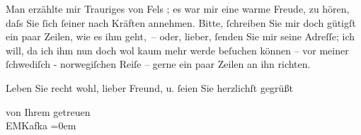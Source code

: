 \pstart
           
               Man erzählte mir Trauriges von 
               Fels
               ; es war mir
               eine warme Freude, zu hören, daſs Sie ſich ſeiner nach Kräften annehmen. Bitte,
               ſchreiben Sie mir doch gütigſt ein paar Zeilen, wie es ihm geht, – oder, lieber,
               ſenden Sie mir seine Adreſſe; ich will, da ich ihm nun doch wol kaum mehr werde
               beſuchen können – vor meiner 
               ſchwediſch
               -
               norwegiſchen
                Reiſe – gerne ein paar Zeilen an
               ihn richten.
            \pend
           
\pstart
           Leben Sie recht wohl, lieber Freund, u. ſeien Sie herzlichſt gegrüßt\pend
           
\pstart
           
               von Ihrem getreuen
               {\\[\baselineskip]}\spacefill\mbox{EMKafka}\pend
           \leftskip=0em{}\endnumbering{}  
      